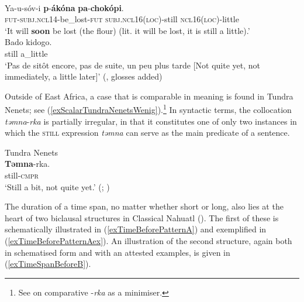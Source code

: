 \begin{exe}
	\ex {}\label{exScalarMandaSoon}\\
	\gll Ya-u-sóv-i \textbf{p}-\textbf{ákóna} \textbf{pa}-\textbf{chokópi}.\\
	\textsc{fut}-\textsc{subj}.\textsc{ncl}14-be\_lost-\textsc{fut} \textsc{subj}.\textsc{ncl}16(\textsc{loc})-still \textsc{ncl}16(\textsc{loc})-little\\
	\glt \lq It will \textbf{soon} be lost (the flour) (lit. it will be lost, it is still a little).\rq{ }\parencite[58]{Bernander2021}
	\ex {}\label{exScalarExtensionsSwahili}\\
	\gll Bado kidogo.\\
	still a\_little\\
	\glt \lq Pas de sitôt encore, pas de suite, un peu plus tarde [Not quite yet, not immediately, a little later]\rq{ }(\cite[85]{Sacleux19391941},  glosses added)
\end{exe}
	
Outside of East Africa, a case that is comparable in meaning is found in Tundra Nenets; see (\ref{exScalarTundraNenetsWenig}).\footnote{See \textcite[133–134]{Nikolaeva2014} on comparative \mbox{-\textit{rka}} as a minimiser.} In syntactic terms, the collocation \mbox{\textit{təmna}-\textit{rka}} is partially irregular, in that it constitutes one of only two instances in which the \textsc{still} expression \textit{təmna} can serve as the main predicate of a sentence.

\begin{exe}
	\ex Tundra Nenets\label{exScalarTundraNenetsWenig}\\
	\gll \textbf{Təmna}-rka.\\
	still-\textsc{cmpr}\\
	\glt \lq Still a bit, not quite yet.\rq{ } (\cite[458]{Lehtisalo1956}; \cite[624]{Tereshchenko2008})
\end{exe}

The duration of a time span, no matter whether short or long, also lies at the heart of two biclausal structures in Classical Nahuatl (). The first of these is schematically illustrated in (\ref{exTimeBeforePatternA}) and exemplified in (\ref{exTimeBeforePatternAex}). An illustration of the second structure, again both in schematised form and with an attested examples, is given in (\ref{exTimeSpanBeforeB}).\largerpage[-1]


